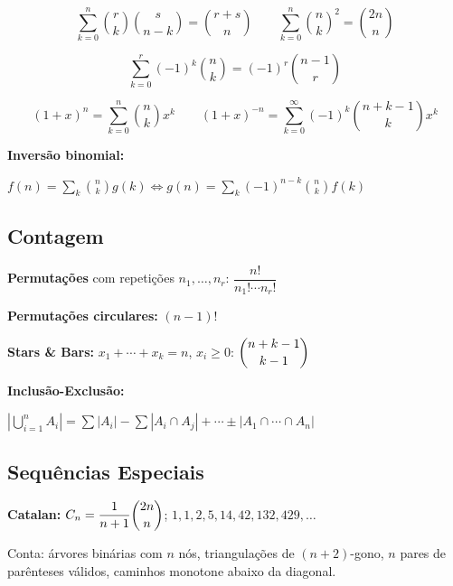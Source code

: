 \[\sum_{k=0}^n \binom{r}{k}\binom{s}{n-k} = \binom{r+s}{n} \qquad \sum_{k=0}^n \binom{n}{k}^2 = \binom{2n}{n}\]

\[\sum_{k=0}^r (-1)^k\binom{n}{k} = (-1)^r\binom{n-1}{r}\]

\[(1+x)^n = \sum_{k=0}^n \binom{n}{k}x^k \qquad (1+x)^{-n} = \sum_{k=0}^\infty (-1)^k\binom{n+k-1}{k}x^k\]

\textbf{Inversão binomial:} 

$f(n)=\sum_{k}\binom{n}{k}g(k) \Leftrightarrow g(n)=\sum_{k}(-1)^{n-k}\binom{n}{k}f(k)$

\subsection{Contagem}

\textbf{Permutações} com repetições $n_1,\ldots,n_r$: $\dfrac{n!}{n_1!\cdots n_r!}$

\textbf{Permutações circulares:} $(n-1)!$

\textbf{Stars \& Bars:} $x_1+\cdots+x_k=n$, $x_i\geq0$: $\dbinom{n+k-1}{k-1}$

\textbf{Inclusão-Exclusão:} 

$\left|\bigcup_{i=1}^n A_i\right| = \sum|A_i| - \sum|A_i\cap A_j| + \cdots \pm|A_1\cap\cdots\cap A_n|$

\subsection{Sequências Especiais}

\textbf{Catalan:} $C_n = \dfrac{1}{n+1}\dbinom{2n}{n}$; \quad $1,1,2,5,14,42,132,429,\ldots$

Conta: árvores binárias com $n$ nós, triangulações de $(n{+}2)$-gono, $n$ pares de parênteses válidos, caminhos monotone abaixo da diagonal.

\vspace{16pt}

